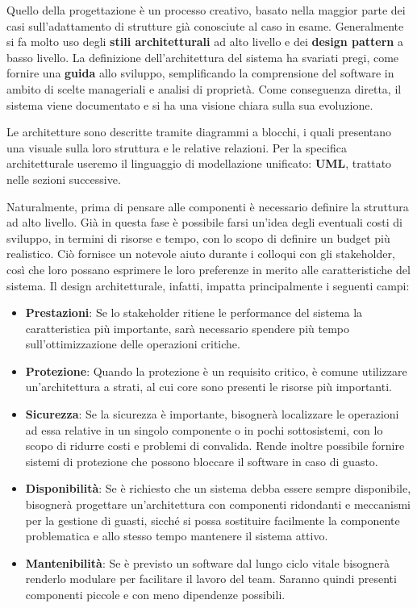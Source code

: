 \noindent Quello della progettazione è un processo creativo, basato nella maggior parte dei casi sull'adattamento di strutture già conosciute al caso in esame. Generalmente si fa molto uso degli \textbf{stili architetturali} ad alto livello e dei \textbf{design pattern} a basso livello. La definizione dell'architettura del sistema ha svariati pregi, come fornire una \textbf{guida} allo sviluppo, semplificando la comprensione del software in ambito di scelte manageriali e analisi di proprietà. Come conseguenza diretta, il sistema viene documentato e si ha una visione chiara sulla sua evoluzione.\par
Le architetture sono descritte tramite diagrammi a blocchi, i quali presentano una visuale sulla loro struttura e le relative relazioni. Per la specifica architetturale useremo il linguaggio di modellazione unificato: \textbf{UML}, trattato nelle sezioni successive.\par
Naturalmente, prima di pensare alle componenti è necessario definire la struttura ad alto livello. Già in questa fase è possibile farsi un'idea degli eventuali costi di sviluppo, in termini di risorse e tempo, con lo scopo di definire un budget più realistico. Ciò fornisce un notevole aiuto durante i colloqui con gli stakeholder, così che loro possano esprimere le loro preferenze in merito alle caratteristiche del sistema. Il design architetturale, infatti, impatta principalmente i seguenti campi: \begin{itemize}
	\item \textbf{Prestazioni}: Se lo stakeholder ritiene le performance del sistema la caratteristica più importante, sarà necessario spendere più tempo sull'ottimizzazione delle operazioni critiche.
	\item \textbf{Protezione}: Quando la protezione è un requisito critico, è comune utilizzare un'architettura a strati, al cui core sono presenti le risorse più importanti.
	\item \textbf{Sicurezza}: Se la sicurezza è importante, bisognerà localizzare le operazioni ad essa relative in un singolo componente o in pochi sottosistemi, con lo scopo di ridurre costi e problemi di convalida. Rende inoltre possibile fornire sistemi di protezione che possono bloccare il software in caso di guasto.
	\item \textbf{Disponibilità}: Se è richiesto che un sistema debba essere sempre disponibile, bisognerà progettare un'architettura con componenti ridondanti e meccanismi per la gestione di guasti, sicché si possa sostituire facilmente la componente problematica e allo stesso tempo mantenere il sistema attivo.
	\item \textbf{Mantenibilità}: Se è previsto un software dal lungo ciclo vitale bisognerà renderlo modulare per facilitare il lavoro del team. Saranno quindi presenti componenti piccole e con meno dipendenze possibili.
\end{itemize}

